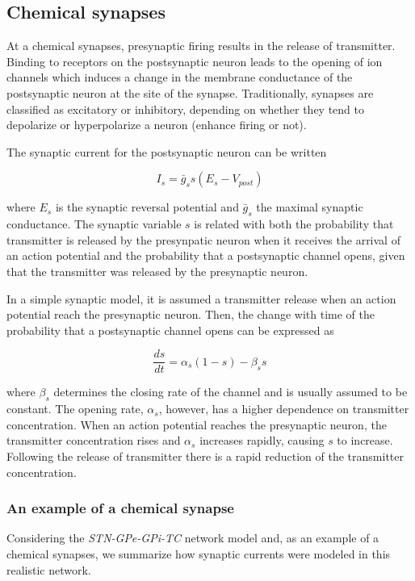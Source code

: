\subsection{Chemical synapses}
At a chemical synapses, presynaptic firing results in the release of transmitter. Binding to receptors on the postsynaptic neuron leads to the opening of ion channels which induces a change in the membrane conductance of the postsynaptic neuron at the site of the synapse. Traditionally, synapses are classified as excitatory or inhibitory, depending on whether they tend to depolarize or hyperpolarize a neuron (enhance firing or not).

The synaptic current for the postsynaptic neuron can be written 

\begin{equation}
    I_{s} = \bar{g}_{s}s(E_{s}-V_{post})
\end{equation}

where $E_{s}$ is the synaptic reversal potential and $\bar{g}_{s}$ the maximal synaptic conductance. The synaptic variable $s$ is related with both the probability that transmitter is released by the presynpatic neuron when it receives the arrival of an action potential and the probability that a postsynaptic channel opens, given that the transmitter was released by the presynaptic neuron.

In a simple synaptic model, it is assumed a transmitter release when an action potential reach the presynaptic neuron. Then, the change with time of the probability that a postsynaptic channel opens can be expressed as

\begin{equation}
    \frac{ds}{dt} = \alpha_{s}(1-s)-\beta_{s}s
\end{equation}

where $\beta_{s}$ determines the closing rate of the channel and is usually assumed to be constant. The opening rate, $\alpha_{s}$, however, has a higher dependence on transmitter concentration. When an action potential reaches the presynaptic neuron, the transmitter concentration rises and $\alpha_{s}$ increases rapidly, causing $s$ to increase. Following the release of transmitter there is a rapid reduction of the transmitter concentration.

\subsubsection{An example of a chemical synapse}
Considering the \textit{STN-GPe-GPi-TC} network model and, as an example of a chemical synapses, we summarize how synaptic currents were modeled in this realistic network.

